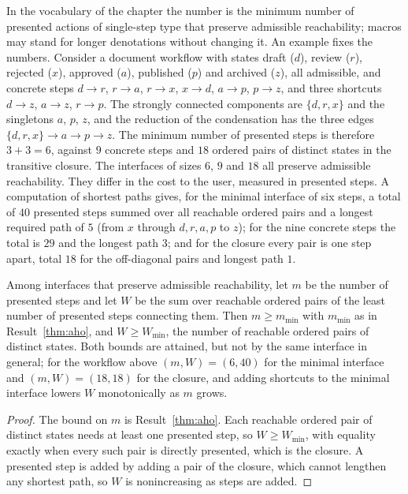In the vocabulary of the chapter the number is the minimum number of presented actions of single-step type that preserve admissible reachability; macros may stand for longer denotations without changing it. An example fixes the numbers. Consider a document workflow with states draft ($d$), review ($r$), rejected ($x$), approved ($a$), published ($p$) and archived ($z$), all admissible, and concrete steps $d\to r$, $r\to a$, $r\to x$, $x\to d$, $a\to p$, $p\to z$, and three shortcuts $d\to z$, $a\to z$, $r\to p$. The strongly connected components are $\{d,r,x\}$ and the singletons $a$, $p$, $z$, and the reduction of the condensation has the three edges $\{d,r,x\}\to a\to p\to z$. The minimum number of presented steps is therefore $3+3=6$, against $9$ concrete steps and $18$ ordered pairs of distinct states in the transitive closure. The interfaces of sizes $6$, $9$ and $18$ all preserve admissible reachability. They differ in the cost to the user, measured in presented steps. A computation of shortest paths gives, for the minimal interface of six steps, a total of $40$ presented steps summed over all reachable ordered pairs and a longest required path of $5$ (from $x$ through $d,r,a,p$ to $z$); for the nine concrete steps the total is $29$ and the longest path $3$; and for the closure every pair is one step apart, total $18$ for the off-diagonal pairs and longest path $1$.

\begin{newresult}\label{prop:size-effort}
Among interfaces that preserve admissible reachability, let $m$ be the number of presented steps and let $W$ be the sum over reachable ordered pairs of the least number of presented steps connecting them. Then $m\ge m_{\min}$ with $m_{\min}$ as in Result~\ref{thm:aho}, and $W\ge W_{\min}$, the number of reachable ordered pairs of distinct states. Both bounds are attained, but not by the same interface in general; for the workflow above $(m,W)=(6,40)$ for the minimal interface and $(m,W)=(18,18)$ for the closure, and adding shortcuts to the minimal interface lowers $W$ monotonically as $m$ grows.
\end{newresult}
\begin{proof}
The bound on $m$ is Result~\ref{thm:aho}. Each reachable ordered pair of distinct states needs at least one presented step, so $W\ge W_{\min}$, with equality exactly when every such pair is directly presented, which is the closure. A presented step is added by adding a pair of the closure, which cannot lengthen any shortest path, so $W$ is nonincreasing as steps are added.
\end{proof}

